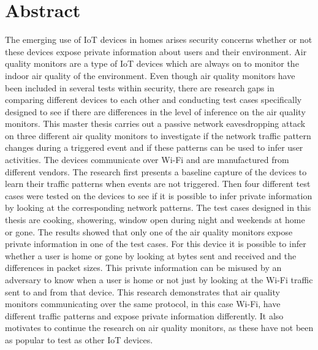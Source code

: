 \chapter*{Abstract}
The emerging use of IoT devices in homes arises security concerns whether or not these devices expose private information about users and their environment. Air quality monitors are a type of IoT devices which are always on to monitor the indoor air quality of the environment. Even though air quality monitors have been included in several tests within security, there are research gaps in comparing different devices to each other and conducting test cases specifically designed to see if there are differences in the level of inference on the air quality monitors. This master thesis carries out a passive network eavesdropping attack on three different air quality monitors to investigate if the network traffic pattern changes during a triggered event and if these patterns can be used to infer user activities. The devices communicate over Wi-Fi and are manufactured from different vendors. The research first presents a baseline capture of the devices to learn their traffic patterns when events are not triggered. Then four different test cases were tested on the devices to see if it is possible to infer private information by looking at the corresponding network patterns. The test cases designed in this thesis are cooking, showering, window open during night and weekends at home or gone. The results showed that only one of the air quality monitors expose private information in one of the test cases. For this device it is possible to infer whether a user is home or gone by looking at bytes sent and received and the differences in packet sizes. This private information can be misused by an adversary to know when a user is home or not just by looking at the Wi-Fi traffic sent to and from that device. This research demonstrates that air quality monitors communicating over the same protocol, in this case Wi-Fi, have different traffic patterns and expose private information differently. It also motivates to continue the research on air quality monitors, as these have not been as popular to test as other IoT devices. 